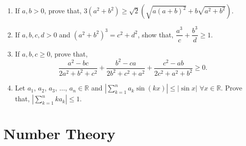\documentclass[11pt, a4paper]{article}
\begin{document}
\begin{enumerate}
	\item If $a, b > 0$, prove that, $3(a^2 + b^2) \geq \sqrt{2}\left(\sqrt{a(a+b)^2} + b\sqrt{a^2 + b^2}\right)$.
	
	\item If $a, b, c, d > 0$ and $(a^2 + b^2)^3 = c^2 + d^2$, show that, $\dfrac{a^3}{c} + \dfrac{b^3}{d} \geq 1$.
	
	\item If $a, b, c \geq 0$, prove that, $$\dfrac{a^2 - bc}{2a^2 + b^2 + c^2} + \dfrac{b^2 - ca}{2b^2 + c^2 + a^2} + \dfrac{c^2 - ab}{2c^2 + a^2 + b^2} \geq 0.$$
	
	\item Let $a_1$, $a_2$, $a_3$, $\ldots$, $a_n \in \mathbb{R}$ and $\left| \sum \limits_{k = 1}^{n} a_k \sin (kx) \right| \leq \left| \sin x \right|$ $\forall x \in \mathbb{R}$. Prove that, $\left| \sum \limits_{k = 1}^{n} ka_k \right| \leq 1$.
	
	
\end{enumerate}





\section{Number Theory}
\end{document}
